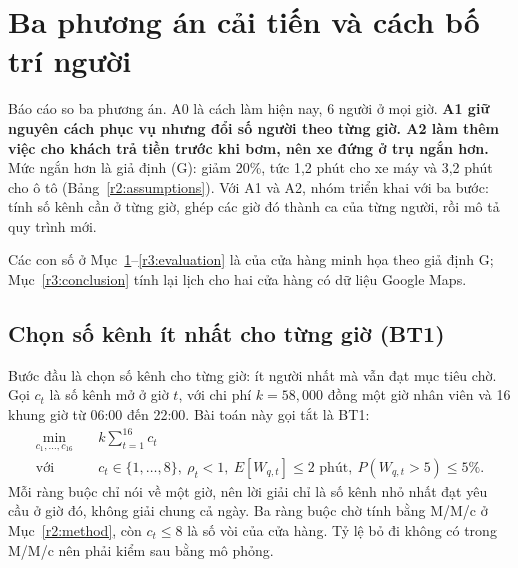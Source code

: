 
\section{Ba phương án cải tiến và cách bố trí người}
\label{r3:tobe}
\noindent
Báo cáo so ba phương án. A0 là cách làm hiện nay, 6 người ở mọi giờ. \textbf{A1 giữ nguyên cách phục vụ nhưng đổi số người theo từng giờ. A2 làm thêm việc cho khách trả tiền trước khi bơm, nên xe đứng ở trụ ngắn hơn.} Mức ngắn hơn là giả định (G): giảm 20\%, tức 1,2 phút cho xe máy và 3,2 phút cho ô tô (Bảng~\ref{r2:assumptions}).
% 
Với A1 và A2, nhóm triển khai với ba bước: tính số kênh cần ở từng giờ, ghép các giờ đó thành ca của từng người, rồi mô tả quy trình mới.

Các con số ở Mục~\ref{r3:tobe}--\ref{r3:evaluation} là của cửa hàng minh họa theo giả định G; Mục~\ref{r3:conclusion} tính lại lịch cho hai cửa hàng có dữ liệu Google Maps.

\subsection{Chọn số kênh ít nhất cho từng giờ (BT1)}
\label{r3:bt1}
\noindent
Bước đầu là chọn số kênh cho từng giờ: ít người nhất mà vẫn đạt mục tiêu chờ. Gọi $c_t$ là số kênh mở ở giờ $t$, với chi phí $k=58{,}000$ đồng một giờ nhân viên và 16 khung giờ từ 06:00 đến 22:00. Bài toán này gọi tắt là BT1:
\begin{align}
\min_{c_1,\ldots,c_{16}}\quad & k\textstyle\sum_{t=1}^{16}c_t \\
\text{với}\quad & c_t\in\{1,\ldots,8\},\ \rho_t<1,\ E[W_{q,t}]\le2\text{ phút},\ P(W_{q,t}>5)\le5\%. \nonumber
\end{align}
Mỗi ràng buộc chỉ nói về một giờ, nên lời giải chỉ là số kênh nhỏ nhất đạt yêu cầu ở giờ đó, không giải chung cả ngày. Ba ràng buộc chờ tính bằng M/M/c ở Mục~\ref{r2:method}, còn $c_t\le8$ là số vòi của cửa hàng. Tỷ lệ bỏ đi không có trong M/M/c nên phải kiểm sau bằng mô phỏng.

